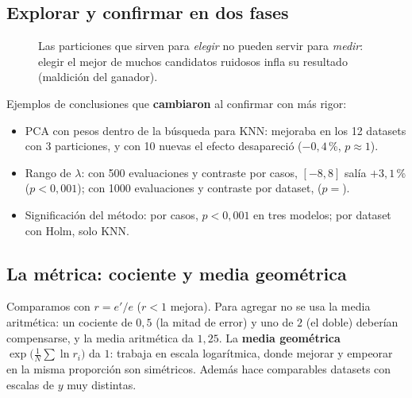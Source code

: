 \documentclass[apuntes]{uc3mmaster}
\begin{document}
\subsection{Explorar y confirmar en dos fases}
\begin{figure}[h]\centering
{}
\caption{Las particiones que sirven para \emph{elegir} no pueden servir para \emph{medir}: elegir el mejor de muchos
candidatos ruidosos infla su resultado (maldición del ganador).}
\end{figure}

Ejemplos de conclusiones que \textbf{cambiaron} al confirmar con más rigor:
\begin{itemize}
\item PCA con pesos dentro de la búsqueda para KNN: mejoraba en los 12 datasets con 3 particiones, y con 10 nuevas
el efecto desapareció ($-0{,}4$\,\%, $p\approx1$).
\item Rango de $\lambda$: con 500 evaluaciones y contraste por casos, $[-8,8]$ salía $+3{,}1$\,\% ($p<0{,}001$); con
1000 evaluaciones y contraste por dataset, \rangoOchoR{} ($p=$\pRangoOcho).
\item Significación del método: por casos, $p<0{,}001$ en tres modelos; por dataset con Holm, solo KNN.
\end{itemize}

\subsection{La métrica: cociente y media geométrica}
Comparamos con $r=e'/e$ ($r<1$ mejora). Para agregar no se usa la media aritmética: un cociente de $0{,}5$ (la mitad
de error) y uno de $2$ (el doble) deberían compensarse, y la media aritmética da $1{,}25$. La \textbf{media
geométrica} $\exp\big(\tfrac1N\sum\ln r_i\big)$ da $1$: trabaja en escala logarítmica, donde mejorar y empeorar en la
misma proporción son simétricos. Además hace comparables datasets con escalas de $y$ muy distintas.
\end{document}
